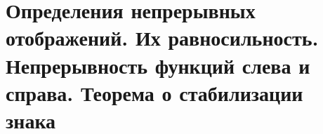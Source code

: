 \section{Определения непрерывных отображений. Их равносильность. Непрерывность функций слева и справа. Теорема о стабилизации знака}